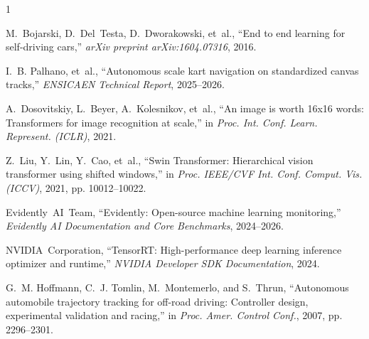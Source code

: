 \documentclass[10pt,journal,compsoc]{IEEEtran}
\begin{document}
\begin{thebibliography}{1}

M.~Bojarski, D.~Del~Testa, D.~Dworakowski, et~al., ``End to end learning for self-driving cars,'' \emph{arXiv preprint arXiv:1604.07316}, 2016.

I.~B. Palhano, et~al., ``Autonomous scale kart navigation on standardized canvas tracks,'' \emph{ENSICAEN Technical Report}, 2025--2026.

A.~Dosovitskiy, L.~Beyer, A.~Kolesnikov, et~al., ``An image is worth 16x16 words: Transformers for image recognition at scale,'' in \emph{Proc. Int. Conf. Learn. Represent. (ICLR)}, 2021.

Z.~Liu, Y.~Lin, Y.~Cao, et~al., ``Swin Transformer: Hierarchical vision transformer using shifted windows,'' in \emph{Proc. IEEE/CVF Int. Conf. Comput. Vis. (ICCV)}, 2021, pp. 10012--10022.

Evidently~AI~Team, ``Evidently: Open-source machine learning monitoring,'' \emph{Evidently AI Documentation and Core Benchmarks}, 2024--2026.

NVIDIA~Corporation, ``TensorRT: High-performance deep learning inference optimizer and runtime,'' \emph{NVIDIA Developer SDK Documentation}, 2024.

G.~M. Hoffmann, C.~J. Tomlin, M.~Montemerlo, and S.~Thrun, ``Autonomous automobile trajectory tracking for off-road driving: Controller design, experimental validation and racing,'' in \emph{Proc. Amer. Control Conf.}, 2007, pp. 2296--2301.

\end{thebibliography}
\end{document}

